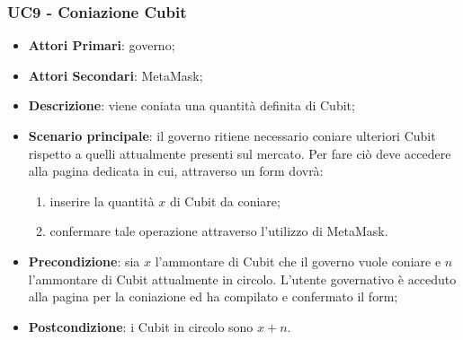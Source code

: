 \subsubsection{UC9 - Coniazione Cubit}
\begin{itemize}
	\item \textbf{Attori Primari}: governo;
	\item \textbf{Attori Secondari}: MetaMask\glo;
	\item \textbf{Descrizione}: viene coniata una quantità definita di Cubit\glo;
	
	\item \textbf{Scenario principale}: il governo ritiene necessario coniare ulteriori Cubit rispetto a quelli attualmente presenti sul mercato. Per fare ciò deve accedere alla pagina dedicata in cui, attraverso un form dovrà:
	 \begin{enumerate}[label=\alph*.]
		\item inserire la quantità $x$ di Cubit da coniare;
		\item confermare tale operazione attraverso l'utilizzo di MetaMask\glo.
	\end{enumerate}
	\item \textbf{Precondizione}: sia $x$ l'ammontare di Cubit che il governo 
	vuole coniare e $n$ l'ammontare di Cubit attualmente in circolo. L'utente 
	governativo è acceduto alla pagina per la coniazione ed ha compilato e 
	confermato il form;
	\item \textbf{Postcondizione}: i Cubit in circolo sono $x+n$.
\end{itemize}
